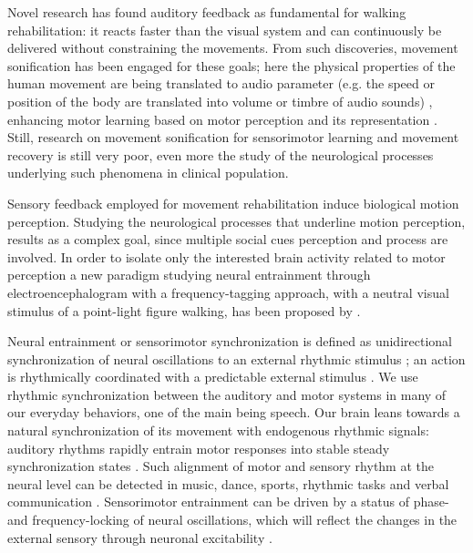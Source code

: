Novel research has found auditory feedback as fundamental for walking rehabilitation: it reacts faster than the visual system and can continuously be delivered without constraining the movements. From such discoveries, movement sonification has been engaged for these goals; here the physical properties of the human movement are being translated to audio parameter (e.g. the speed or position of the body are translated into volume or timbre of audio sounds) \parencite{Effenberg_2016}, enhancing motor learning based on motor perception and its representation \parencite{Bevilacqua_2016}. \\
Still, research on movement sonification for sensorimotor learning and movement recovery is still very poor, even more the study of the neurological processes underlying such phenomena in clinical population.

Sensory feedback employed for movement rehabilitation induce biological motion perception. Studying the neurological processes that underline motion perception, results as a complex goal, since multiple social cues perception and process are involved. In order to isolate only the interested brain activity related to motor perception a new paradigm studying neural entrainment through electroencephalogram with a frequency-tagging approach, with a neutral visual stimulus of a point-light figure walking, has been proposed by \cite{Cracco_2022}. 

Neural entrainment or sensorimotor synchronization is defined as unidirectional synchronization of neural oscillations to an external rhythmic stimulus \parencite{Lakatos_2019, Haegens_2018}; an action is rhythmically coordinated with a predictable external stimulus \parencite{Pressing_1999}. We use rhythmic synchronization between the auditory and motor systems in many of our everyday behaviors, one of the main being speech. Our brain leans towards a natural synchronization of its movement with endogenous rhythmic signals: auditory rhythms rapidly entrain motor responses into stable steady synchronization states \parencite{Thaut_2003}. Such alignment of motor and sensory rhythm at the neural level can be detected in music, dance, sports, rhythmic tasks and verbal communication \parencite{Rosso_2023}. Sensorimotor entrainment can be driven by a status of phase- and frequency-locking of neural oscillations, which will reflect the changes in the external sensory through neuronal excitability \parencite{Lakatos_2005}. 

